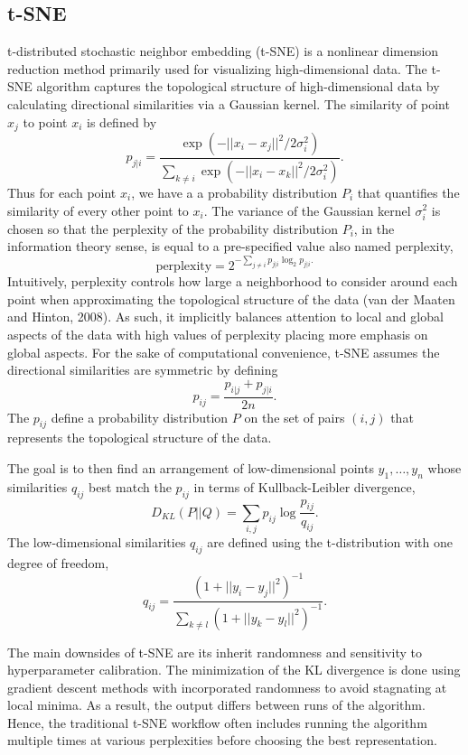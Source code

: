 \documentclass[webpdf,modern,large,namedate]{oup-authoring-template}
\theoremstyle{thmstyleone}%
\theoremstyle{thmstyletwo}%
\theoremstyle{thmstylethree}%
\begin{document}
\subsection{t-SNE}
t-distributed stochastic neighbor embedding (t-SNE) is a nonlinear dimension reduction method primarily used for visualizing high-dimensional data. The t-SNE algorithm captures the topological structure of high-dimensional data by calculating directional similarities via a Gaussian kernel. The similarity of point $x_j$ to point $x_i$ is defined by $$p_{j|i} = \frac{\exp(-||x_i - x_j||^2/2\sigma_i^2)}{\sum_{k \neq i} \exp(-||x_i-x_k||^2/2\sigma_i^2)}.$$ Thus for each point $x_i$, we have a a probability distribution $P_i$ that quantifies the similarity of every other point to $x_i$. The variance of the Gaussian kernel $\sigma_i^2$ is chosen so that the perplexity of the probability distribution $P_i$, in the information theory sense, is equal to a pre-specified value also named perplexity, $$\textrm{perplexity} = 2^{-\sum_{j \neq i} p_{j|i}\log_2 p_{j|i}.}$$ Intuitively, perplexity controls how large a neighborhood to consider around each point when approximating the topological structure of the data (van der Maaten and Hinton, 2008). As such, it implicitly balances attention to local and global aspects of the data with high values of perplexity placing more emphasis on global aspects. For the sake of computational convenience, t-SNE assumes the directional similarities are symmetric by defining $$p_{ij} = \frac{p_{i|j} + p_{j|i}}{2n}.$$ The $p_{ij}$ define a probability distribution $P$ on the set of pairs $(i,j)$ that represents the topological structure of the data.

The goal is to then find an arrangement of low-dimensional points $y_1, \hdots, y_n$ whose similarities $q_{ij}$ best match the $p_{ij}$ in terms of Kullback-Leibler divergence, $$D_{KL}(P || Q) = \sum_{i,j} p_{ij} \log \frac{p_{ij}}{q_{ij}}.$$ The low-dimensional similarities $q_{ij}$ are defined using the t-distribution with one degree of freedom, $$q_{ij} = \frac{(1 + ||y_i - y_j||^2)^{-1}}{ \sum_{k \neq l} (1 + ||y_k - y_l||^2)^{-1}}.$$

The main downsides of t-SNE are its inherit randomness and sensitivity to hyperparameter calibration. The minimization of the KL divergence is done using gradient descent methods with incorporated randomness to avoid stagnating at local minima. As a result, the output differs between runs of the algorithm. Hence, the traditional t-SNE workflow often includes running the algorithm multiple times at various perplexities before choosing the best representation.
\end{document}
